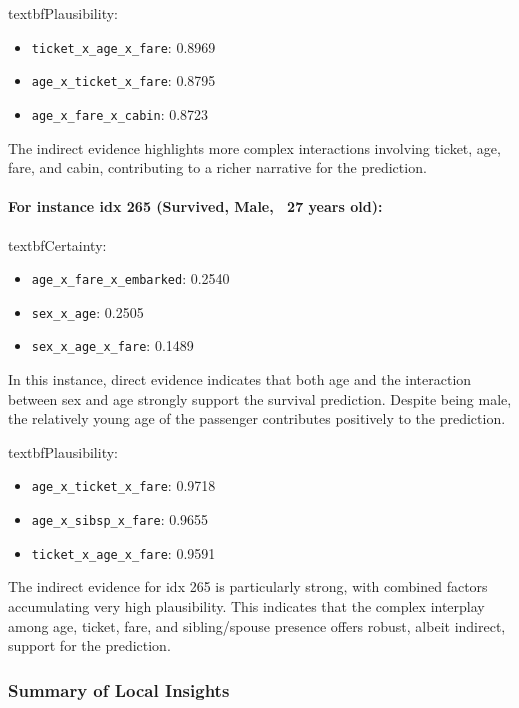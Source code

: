 \documentclass[acmlarge]{acmart}
\begin{document}
textbf{Plausibility:}
\begin{itemize}
    \item \texttt{ticket_x_age_x_fare}: 0.8969
    \item \texttt{age\_x\_ticket\_x\_fare}: 0.8795
    \item \texttt{age\_x\_fare\_x\_cabin}: 0.8723
\end{itemize}
The indirect evidence highlights more complex interactions involving ticket, age, fare, and cabin, contributing to a richer narrative for the prediction.

\paragraph{For instance idx 265 (Survived, Male, ~27 years old):}  
\newline 
textbf{Certainty:}
\begin{itemize}
    \item \texttt{age\_x\_fare\_x\_embarked}: 0.2540
    \item \texttt{sex\_x\_age}: 0.2505
    \item \texttt{sex\_x\_age\_x\_fare}: 0.1489
\end{itemize}
In this instance, direct evidence indicates that both age and the interaction between sex and age strongly support the survival prediction. Despite being male, the relatively young age of the passenger contributes positively to the prediction.

textbf{Plausibility:}
\begin{itemize}
    \item \texttt{age\_x\_ticket\_x\_fare}: 0.9718
    \item \texttt{age\_x\_sibsp\_x\_fare}: 0.9655
    \item \texttt{ticket_x_age_x_fare}: 0.9591

\end{itemize}
The indirect evidence for idx 265 is particularly strong, with combined factors accumulating very high plausibility. This indicates that the complex interplay among age, ticket, fare, and sibling/spouse presence offers robust, albeit indirect, support for the prediction.

\subsubsection{Summary of Local Insights}
\end{document}
